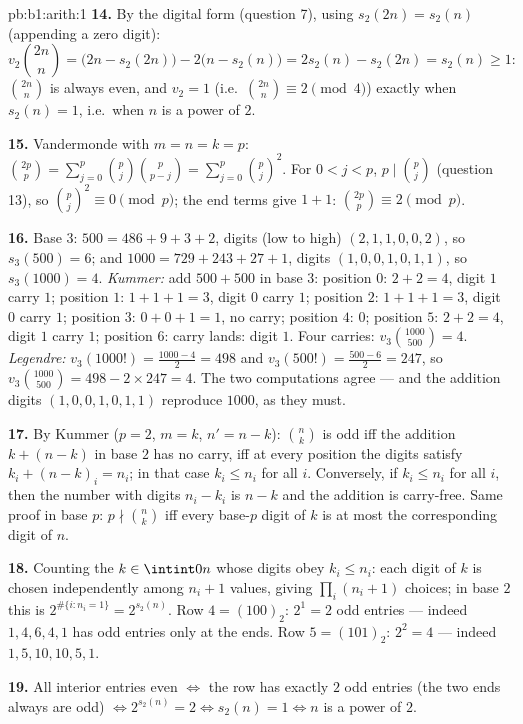 \begin{solution}{pb:b1:arith:1}
\textbf{14.} By the digital form (question 7), using $s_2(2n) =
s_2(n)$ (appending a zero digit):
\[
v_2\binom{2n}n = \bigl(2n - s_2(2n)\bigr) - 2\bigl(n -
s_2(n)\bigr) = 2s_2(n) - s_2(2n) = s_2(n) \geq 1 :
\]
$\binom{2n}n$ is always even, and $v_2 = 1$ (i.e.\ $\binom{2n}n
\equiv 2 \pmod 4$) exactly when $s_2(n) = 1$, i.e.\ when $n$ is a
power of $2$.

\textbf{15.} Vandermonde with $m = n = k = p$: $\binom{2p}p =
\sum_{j=0}^p \binom pj\binom p{p-j} = \sum_{j=0}^p \binom pj^2$.
For $0 < j < p$, $p \mid \binom pj$ (question 13), so $\binom
pj^2 \equiv 0 \pmod p$; the end terms give $1 + 1$:
$\binom{2p}p \equiv 2 \pmod p$.

\textbf{16.} Base $3$: $500 = 486 + 9 + 3 + 2$, digits (low to
high) $(2, 1, 1, 0, 0, 2)$, so $s_3(500) = 6$; and $1000 = 729 +
243 + 27 + 1$, digits $(1, 0, 0, 1, 0, 1, 1)$, so $s_3(1000) = 4$.
\emph{Kummer:} add $500 + 500$ in base $3$: position $0$: $2 + 2 =
4$, digit $1$ carry $1$; position $1$: $1 + 1 + 1 = 3$, digit $0$
carry $1$; position $2$: $1 + 1 + 1 = 3$, digit $0$ carry $1$;
position $3$: $0 + 0 + 1 = 1$, no carry; position $4$: $0$;
position $5$: $2 + 2 = 4$, digit $1$ carry $1$; position $6$:
carry lands: digit $1$. Four carries: $v_3\binom{1000}{500} = 4$.
\emph{Legendre:} $v_3(1000!) = \frac{1000 - 4}2 = 498$ and
$v_3(500!) = \frac{500 - 6}2 = 247$, so $v_3\binom{1000}{500} =
498 - 2\times247 = 4$. The two computations agree --- and the
addition digits $(1, 0, 0, 1, 0, 1, 1)$ reproduce $1000$, as they
must.

\textbf{17.} By Kummer ($p = 2$, $m = k$, $n' = n - k$):
$\binom nk$ is odd iff the addition $k + (n - k)$ in base $2$ has
no carry, iff at every position the digits satisfy $k_i + (n -
k)_i = n_i$; in that case $k_i \leq n_i$ for all $i$. Conversely,
if $k_i \leq n_i$ for all $i$, then the number with digits $n_i -
k_i$ is $n - k$ and the addition is carry-free. Same proof in base
$p$: $p \nmid \binom nk$ iff every base-$p$ digit of $k$ is at
most the corresponding digit of $n$.

\textbf{18.} Counting the $k \in \intint0n$ whose digits obey
$k_i \leq n_i$: each digit of $k$ is chosen independently among
$n_i + 1$ values, giving $\prod_i (n_i + 1)$ choices; in base $2$
this is $2^{\#\{i : n_i = 1\}} = 2^{s_2(n)}$. Row $4 =
(100)_2$: $2^1 = 2$ odd entries --- indeed $1, 4, 6, 4, 1$ has odd
entries only at the ends. Row $5 = (101)_2$: $2^2 = 4$ --- indeed
$1, 5, 10, 10, 5, 1$.

\textbf{19.} All interior entries even $\iff$ the row has exactly
$2$ odd entries (the two ends always are odd) $\iff 2^{s_2(n)} =
2 \iff s_2(n) = 1 \iff n$ is a power of $2$.


\end{solution}
